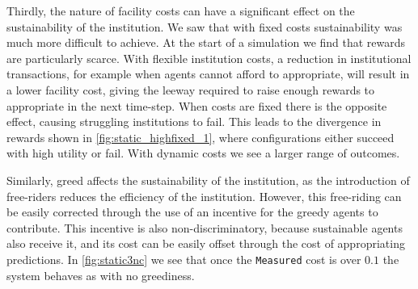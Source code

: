 Thirdly, the nature of facility costs can have a significant effect on the
sustainability of the institution. We saw that with fixed costs sustainability
was much more difficult to achieve. At the start of a simulation we find that
rewards are particularly scarce. With flexible institution costs, a reduction
in institutional transactions, for example when agents cannot afford to
appropriate, will result in a lower facility cost, giving the leeway required
to raise enough rewards to appropriate in the next time-step. When costs are
fixed there is the opposite effect, causing struggling institutions to fail.
This leads to the divergence in rewards shown in
\autoref{fig:static_highfixed_1}, where configurations either succeed with
high utility or fail. With dynamic costs we see a larger range of outcomes.

Similarly, greed affects the sustainability of the institution, as
the introduction of free-riders reduces the efficiency of the institution.
However, this free-riding can be easily corrected through the use of an
incentive for the greedy agents to contribute. This incentive is also
non-discriminatory, because sustainable agents also receive it, and its cost can
be easily offset through the cost of appropriating predictions. In
\autoref{fig:static3nc} we see that once the \texttt{Measured} cost is over
$0.1$ the system behaves as with no greediness.





